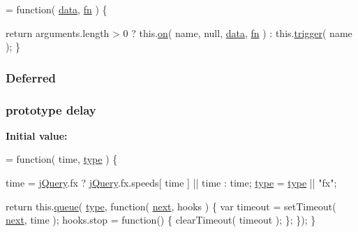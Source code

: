 \begin{DoxyCode}
= \textcolor{keyword}{function}( \hyperlink{jquery-1_810_82-vsdoc_8js_a609407b3456fdc3c5671a9fc4a226ff7}{data}, \hyperlink{jquery-1_810_82-vsdoc_8js_acef6bdaf6b9b20fdcca1ea86f0902c3b}{fn} ) \{


        \textcolor{keywordflow}{return} arguments.length > 0 ?
            this.\hyperlink{jquery-1_810_82-vsdoc_8js_ae453b412b883f60220d73468ef6c6dbc}{on}( name, null, \hyperlink{jquery-1_810_82-vsdoc_8js_a609407b3456fdc3c5671a9fc4a226ff7}{data}, \hyperlink{jquery-1_810_82-vsdoc_8js_acef6bdaf6b9b20fdcca1ea86f0902c3b}{fn} ) :
            this.\hyperlink{jquery-1_810_82-vsdoc_8js_a2388c4114d5e3e4eab020f973641519c}{trigger}( name );
    \}
\end{DoxyCode}
\hypertarget{jquery-1_810_82-vsdoc_8js_ab355ffd82371d88c17da7c1dae9e8829}{
\subsubsection[{Deferred}]{ Deferred}}\label{jquery-1_810_82-vsdoc_8js_ab355ffd82371d88c17da7c1dae9e8829}
\hypertarget{jquery-1_810_82-vsdoc_8js_a90055e3b93c579a9e3f764ee3c04639a}{
\subsubsection[{delay}]{ {\bf prototype} delay}}\label{jquery-1_810_82-vsdoc_8js_a90055e3b93c579a9e3f764ee3c04639a}
{\bfseries Initial value\-:}
\begin{DoxyCode}
= \textcolor{keyword}{function}( time, \hyperlink{jquery-1_810_82-vsdoc_8js_a3940565e83a9bfd10d95ffd27536da91}{type} ) \{


        time = \hyperlink{jquery-1_810_82-vsdoc_8js_add5237586d970a38a81f990e8eb28c6c}{jQuery}.fx ? \hyperlink{jquery-1_810_82-vsdoc_8js_add5237586d970a38a81f990e8eb28c6c}{jQuery}.fx.speeds[ time ] || time : time;
        \hyperlink{jquery-1_810_82-vsdoc_8js_a3940565e83a9bfd10d95ffd27536da91}{type} = \hyperlink{jquery-1_810_82-vsdoc_8js_a3940565e83a9bfd10d95ffd27536da91}{type} || \textcolor{stringliteral}{"fx"};

        \textcolor{keywordflow}{return} this.\hyperlink{jquery-1_810_82-vsdoc_8js_a4a4ce67ab280eb2cff0622a3bdc1f5b3}{queue}( \hyperlink{jquery-1_810_82-vsdoc_8js_a3940565e83a9bfd10d95ffd27536da91}{type}, \textcolor{keyword}{function}( \hyperlink{jquery-1_810_82-vsdoc_8js_a61213ec31ab21de6b8fbe75332157524}{next}, hooks ) \{
            var timeout = setTimeout( \hyperlink{jquery-1_810_82-vsdoc_8js_a61213ec31ab21de6b8fbe75332157524}{next}, time );
            hooks.stop = \textcolor{keyword}{function}() \{
                clearTimeout( timeout );
            \};
        \});
    \}
\end{DoxyCode}
